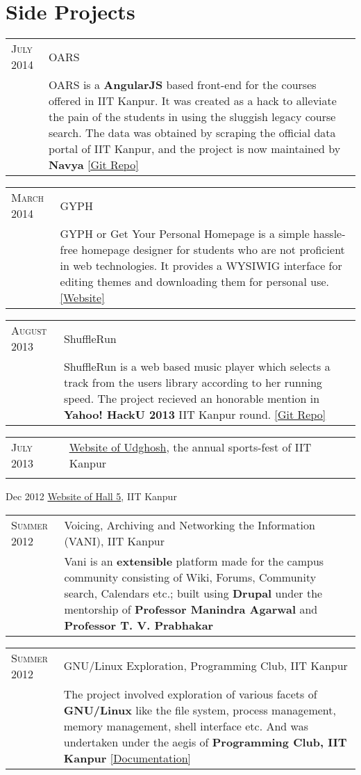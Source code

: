 \documentclass[a4paper,10pt]{article} %
\newcommand{\project}[3]{
    \begin{tabular}{>{\raggedleft}p{2.2cm}|p{17cm}}
        \textsc{#1} & #2 \\
                    & \footnotesize{#3} \\
    \end{tabular}
}
\begin{document}
\section{Side Projects}

\project {July 2014}
         {OARS}
         {OARS is a \textbf{AngularJS} based front-end for the
          courses offered in IIT Kanpur. It was created as a
          hack to alleviate the pain of the students in using the
          sluggish legacy course search. The data was obtained by
          scraping the official data portal of IIT Kanpur, and the
          project is now maintained by \textbf{Navya}
          \href{https://github.com/navya/oars} {[Git Repo]} }

\project {March 2014}
         {GYPH}
         {GYPH or Get Your Personal Homepage
          is a simple hassle-free homepage designer for students who are not
          proficient in web technologies. It provides a WYSIWIG
          interface for editing themes and downloading them for personal use.
          \href{http://gyph2.herokuapp.com/} {[Website]} }

\project {August 2013}
         {ShuffleRun}
         {ShuffleRun is a web based music player which selects a track from the
          users library according to her running speed.
          The project recieved an honorable mention in \textbf{Yahoo!  HackU 2013} IIT Kanpur round.
          \href{https://github.com/srijanshetty/ShuffleRun} {[Git Repo]}}

\project {July 2013}
         {\href{www.udghosh.org}{Website of Udghosh}, the annual sports-fest of IIT Kanpur}

\project {Dec 2012}
         {\href{http://www.iitk.ac.in/hall5}{Website of Hall 5}, IIT Kanpur }

\project {Summer 2012}
         {Voicing, Archiving and Networking the Information \textsc{(VANI)}, IIT Kanpur}
         {Vani is an \textbf{extensible} platform
          made for the campus community consisting of Wiki, Forums,
          Community search, Calendars etc.; built using \textbf{Drupal}
          under the mentorship of \textbf{Professor Manindra Agarwal} and
          \textbf{Professor T. V. Prabhakar} }

\project {Summer 2012}
         {GNU/Linux Exploration, Programming Club, IIT Kanpur}
         {The project involved exploration of various facets of
          \textbf{GNU/Linux} like the file system, process management,
          memory management, shell interface etc. And was
          undertaken under the aegis of \textbf{Programming Club, IIT Kanpur}
          \href{https://docs.google.com/document/d/1ZHO9w36aoq3oaZBR4Um1AOmDfiTDAEgM6baQAu3icw4/edit?usp=sharing}
          {[Documentation]} }
\end{document}
